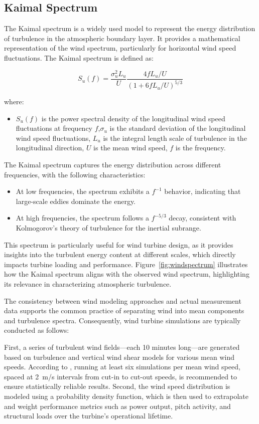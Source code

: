 \subsection{Kaimal Spectrum}
The Kaimal spectrum is a widely used model to represent the energy distribution of turbulence in the atmospheric boundary layer. It provides a mathematical representation of the wind spectrum, particularly for horizontal wind speed fluctuations. The Kaimal spectrum is defined as:

\begin{equation}
S_u(f) = \frac{\sigma_u^2 L_u}{U} \frac{4fL_u/U}{\left(1 + 6fL_u/U\right)^{5/3}}
\end{equation}

where:
\begin{itemize}
    \item $S_u(f)$ is the power spectral density of the longitudinal wind speed fluctuations at frequency $f$,$\sigma_u$ is the standard deviation of the longitudinal wind speed fluctuations, $L_u$ is the integral length scale of turbulence in the longitudinal direction, $U$ is the mean wind speed, $f$ is the frequency.
\end{itemize}

The Kaimal spectrum captures the energy distribution across different frequencies, with the following characteristics:
\begin{itemize}
    \item At low frequencies, the spectrum exhibits a $f^{-1}$ behavior, indicating that large-scale eddies dominate the energy.
    \item At high frequencies, the spectrum follows a $f^{-5/3}$ decay, consistent with Kolmogorov's theory of turbulence for the inertial subrange.
\end{itemize}

This spectrum is particularly useful for wind turbine design, as it provides insights into the turbulent energy content at different scales, which directly impacts turbine loading and performance. Figure~\ref{fig:windspectrum} illustrates how the Kaimal spectrum aligns with the observed wind spectrum, highlighting its relevance in characterizing atmospheric turbulence.

The consistency between wind modeling approaches and actual measurement data supports the common practice of separating wind into mean components and turbulence spectra. Consequently, wind turbine simulations are typically conducted as follows: 

First, a series of turbulent wind fields—each 10 minutes long—are generated based on turbulence and vertical wind shear models for various mean wind speeds. According to \cite{ref50}, running at least six simulations per mean wind speed, spaced at 2~m/s intervals from cut-in to cut-out speeds, is recommended to ensure statistically reliable results. Second, the wind speed distribution is modeled using a probability density function, which is then used to extrapolate and weight performance metrics such as power output, pitch activity, and structural loads over the turbine's operational lifetime.

